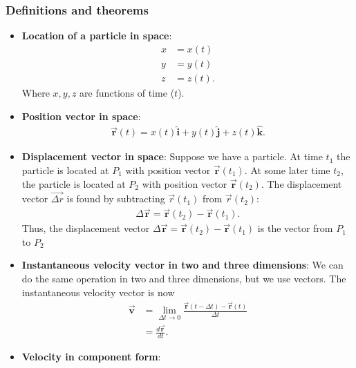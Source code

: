 \documentclass{report}
\begin{document}
    \subsubsection{Definitions and theorems}
    \begin{itemize}
        \item \textbf{Location of a particle in space}:
            \begin{align*}
                x &= x(t) \\
                y &= y(t) \\
                z &= z(t)
            .\end{align*}
            Where $x,y,z$ are functions of time ($t$). 
        \item \textbf{Position vector in space}:
            \begin{align*}
                \vec{\mathbf{r}}(t) = x(t)\hat{\mathbf{i}} + y(t)\hat{\mathbf{j}} + z(t)\hat{\mathbf{k}}
            .\end{align*}
        \item \textbf{Displacement vector in space}: 
            Suppose we have a particle. At time $t_{1}$ the particle is located at $P_{1}$ with position vector $\vec{\mathbf{r}}(t_{1})$. At some later time $t_{2}$, the particle is located at $P_{2}$ with position vector $\vec{\mathbf{r}}(t_{2})$. The displacement vector $\vec{\Delta r}$ is found by subtracting $\vec{r}(t_1)$ from $\vec{r}(t_2)$:
            \begin{align*}
                \Delta \vec{\mathbf{r}} = \vec{\mathbf{r}}(t_{2}) - \vec{\mathbf{r}}(t_{1})
            .\end{align*}
            Thus, the displacement vector $\Delta \vec{\mathbf{r}} = \vec{\mathbf{r}}(t_{2}) - \vec{\mathbf{r}}(t_{1})$ is the vector from $P_{1}$ to $P_{2}$
        \item \textbf{Instantaneous velocity vector in two and three dimensions}: We can do the same operation in two and three dimensions, but we use vectors. The instantaneous velocity vector is now
            \begin{align*}
                \vec{\mathbf{v}} &= \lim\limits_{\Delta t \to 0}{\frac{\vec{\mathbf{r}}(t - \Delta t)-\vec{\mathbf{r}}(t)}{\Delta t}} \\
                &=\frac{d\vec{\mathbf{r}}}{dt}
            .\end{align*}
        \item \textbf{Velocity in component form}:
            \begin{align*}

\end{align*}
\end{itemize}
\end{document}
